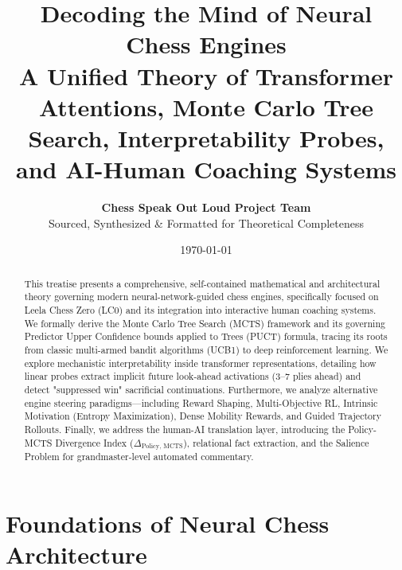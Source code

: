 \documentclass[11pt,a4paper]{report}
\title{\Huge \textbf{Decoding the Mind of Neural Chess Engines}\\[0.5em]
\Large A Unified Theory of Transformer Attentions, Monte Carlo Tree Search, Interpretability Probes, and AI-Human Coaching Systems}
\author{\textbf{Chess Speak Out Loud Project Team}\\
\small Sourced, Synthesized \& Formatted for Theoretical Completeness}
\date{\today}
\begin{document}
\maketitle

\begin{abstract}
\noindent This treatise presents a comprehensive, self-contained mathematical and architectural theory governing modern neural-network-guided chess engines, specifically focused on Leela Chess Zero (LC0) and its integration into interactive human coaching systems. We formally derive the Monte Carlo Tree Search (MCTS) framework and its governing Predictor Upper Confidence bounds applied to Trees (PUCT) formula, tracing its roots from classic multi-armed bandit algorithms (UCB1) to deep reinforcement learning. We explore mechanistic interpretability inside transformer representations, detailing how linear probes extract implicit future look-ahead activations ($3$--$7$ plies ahead) and detect "suppressed win" sacrificial continuations. Furthermore, we analyze alternative engine steering paradigms---including Reward Shaping, Multi-Objective RL, Intrinsic Motivation (Entropy Maximization), Dense Mobility Rewards, and Guided Trajectory Rollouts. Finally, we address the human-AI translation layer, introducing the Policy-MCTS Divergence Index ($\Delta_{\text{Policy, MCTS}}$), relational fact extraction, and the Salience Problem for grandmaster-level automated commentary.
\end{abstract}

\tableofcontents
\newpage

\chapter{Foundations of Neural Chess Architecture}
\end{document}
